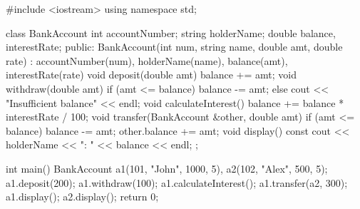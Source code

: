 
\codelabel

\begin{code}
#include <iostream>
using namespace std;

class BankAccount {
    int accountNumber; string holderName; double balance, interestRate;
public:
    BankAccount(int num, string name, double amt, double rate)
        : accountNumber(num), holderName(name), balance(amt), interestRate(rate) {}
    void deposit(double amt) { balance += amt; }
    void withdraw(double amt) {
        if (amt <= balance) balance -= amt;
        else cout << "Insufficient balance" << endl;
    }
    void calculateInterest() { balance += balance * interestRate / 100; }
    void transfer(BankAccount &other, double amt) {
        if (amt <= balance) { balance -= amt; other.balance += amt; }
    }
    void display() const { cout << holderName << ": " << balance << endl; }
};

int main() {
    BankAccount a1(101, "John", 1000, 5), a2(102, "Alex", 500, 5);
    a1.deposit(200); a1.withdraw(100); a1.calculateInterest();
    a1.transfer(a2, 300);
    a1.display(); a2.display();
    return 0;
}
\end{code}

\outputlabel
{}


\codelabel


